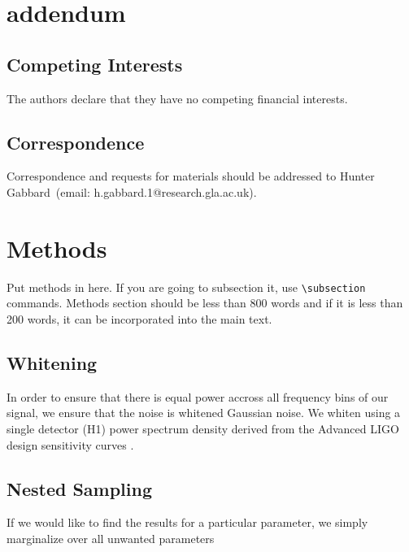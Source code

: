 \documentclass[%
showpacs,
 amsmath,amssymb,
 aps,
 twocolumn,
 prl,
 reprint,
floatfix,
]{revtex4-1}
\begin{document}

\section{addendum}
 \subsection{Competing Interests} 
    The authors declare that they have no competing financial interests.
 \subsection{Correspondence} Correspondence and requests for materials should be addressed to Hunter Gabbard~(email: h.gabbard.1@research.gla.ac.uk).

%
%
\section{Methods}
%
Put methods in here.  If you are going to subsection it, use
\verb|\subsection| commands.  Methods section should be less than
800 words and if it is less than 200 words, it can be incorporated
into the main text.

\subsection{Whitening} \label{whiten_sec}

In order to ensure 
that there is equal power accross all
frequency bins of our signal, we ensure that the noise is whitened Gaussian
noise. We whiten using a single detector (H1) power spectrum density derived from the
Advanced LIGO design sensitivity curves \cite{2016LRR....19....1A}. 

\subsection{Nested Sampling} \label{nested_sec}
%
%
If we would like to find the results for a particular parameter, 
we simply marginalize over all unwanted parameters 
\end{document}
